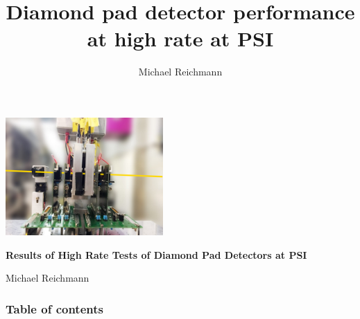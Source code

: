 \documentclass[9pt]{beamer}
\title[Pad Performance]{Diamond pad detector performance at high rate at PSI}
\author[M. Reichmann]{Michael Reichmann}
\institute[\textbf{\textit{ETH}}\scalebox{.6}{\textit{Z\"{u}rich}}]{Swiss Federal Institute of Technology Zurich}
\begin{document}
\begin{frame}
	\begin{center}
		\includegraphics[width=6cm]{Setup1}
	\end{center}
	\begin{alertblock}{
		\begin{center}
			\textbf{Results of High Rate Tests of Diamond Pad Detectors at PSI}
		\end{center}}
		\vspace*{10pt}
		\begin{center}\small
		Michael Reichmann
		\end{center}\normalsize
	\end{alertblock}
\end{frame}
\usebackgroundtemplate{}
\begin{frame}[allowframebreaks]
	\frametitle{Table of contents}
	\tableofcontents   %
\end{frame}
\end{document}
